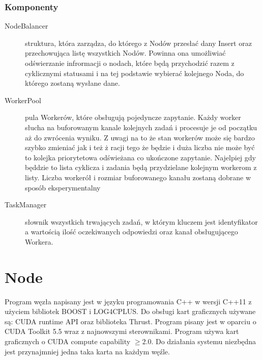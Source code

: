 \documentclass[paper=a4, fontsize=11pt]{scrartcl} %
\numberwithin{equation}{section} %
\numberwithin{figure}{section} %
\numberwithin{table}{section} %
\begin{document}
	\subsubsection{Komponenty}
		\begin{description}
		    \item[NodeBalancer] struktura, która zarządza, do którego z Nodów przesłać dany Insert oraz przechowująca listę wszystkich Nodów.
		    Powinna ona umożliwiać odświerzanie infrormacji o nodach, które będą przychodzić razem z cyklicznymi statusami i na tej podstawie
		    wybierać kolejnego Noda, do którego zostaną wysłane dane. 
		    \item[WorkerPool] pula Workerów, które obsługują pojedyncze zapytanie. Każdy worker słucha na buforowanym kanale kolejnych zadań i 
		    procesuje je od początku aż do zwrócenia wyniku. Z uwagi na to że stan workerów może się bardzo szybko zmieniać jak i też ż racji tego
		    że będzie i duża liczba nie może być to kolejka priorytetowa odświeżana co ukończone zapytanie. Najelpiej gdy będdzie to lista cyklicza
		    i zadania będą przydzielane kolejnym workerom z listy. Liczba workerół i rozmiar buforowanego kanału zostaną dobrane w sposób eksperymentalny
		    \item[TaskManager] słownik wszystkich trwających zadań, w którym kluczem jest identyfikator a wartością ilość oczekiwanych odpowiedzi 
		    oraz kanał obsługującego  Workera.
		\end{description}					

\section{Node}
	Program węzła napisany jest w języku programowania C++ w wersji C++11 z użyciem bibliotek BOOST i LOG4CPLUS. Do obsługi kart 
	graficznych używane są: CUDA runtime API oraz biblioteka Thrust. Program pisany jest w oparciu o CUDA Toolkit 5.5 wraz z najnowszymi sterownikami. 
	Program używa kart graficznych o CUDA compute capability $\geq 2.0$. Do działania systemu niezbędna jest przynajmniej jedna taka karta na każdym węźle.   
\end{document}
